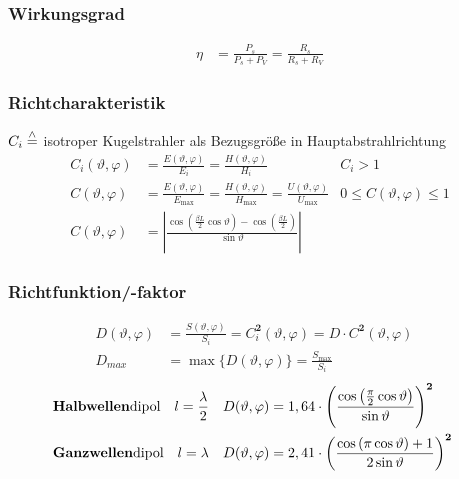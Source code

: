 \subsubsection{Wirkungsgrad}
\begin{align*}
    \eta & = \frac{P_s}{P_s + P_V} = \frac{R_s}{R_s + R_V}
\end{align*}

\subsubsection{Richtcharakteristik}
$C_{i} \stackrel{\wedge}{=}$ isotroper Kugelstrahler als Bezugsgröße in Hauptabstrahlrichtung
\begin{align*}
 	C_{i}(\vartheta, \varphi) & = \frac{E(\vartheta, \varphi)}{E_{i}}=\frac{H(\vartheta, \varphi)}{H_{i}}                                               & C_{i}>1\\
    C(\vartheta, \varphi)     & = \frac{E(\vartheta, \varphi)}{E_{\max}}=\frac{H(\vartheta, \varphi)}{H_{\max}} = \frac{U(\vartheta,\varphi)}{U_{\max}} & 0 \leq C(\vartheta, \varphi) \leq 1 \\
    C(\vartheta, \varphi) &= 
    \left|\frac{\cos\left(\frac{\beta L}{2}\cos\vartheta\right)-\cos\left(\frac{\beta L}{2}\right)}{\sin\vartheta}\right|
\end{align*}

\subsubsection{Richtfunktion/-faktor}
\begin{align*}
    D(\vartheta, \varphi) & = \frac{S(\vartheta, \varphi)}{S_{i}} = C^\mathbf{2}_i(\vartheta, \varphi) = D \cdot C^\mathbf{2}(\vartheta, \varphi) &\\
    D_{max} & = \max \{D(\vartheta, \varphi)\} = \frac{S_{\max}}{S_{i}}&
\end{align*}
\vspace{-0.5cm}
\begin{align*}
	&\text{\textbf{Halbwellen}dipol}\quad l=\frac{\lambda}{2} &D(\vartheta, \varphi) &= 1,64 \cdot  
	\left(\frac{\cos\left(\frac{\pi}{2}\cos\vartheta\right)}{\sin\vartheta}\right)^\mathbf{2}&\\
	&\text{\textbf{Ganzwellen}dipol}\quad l=\lambda &D(\vartheta, \varphi) &= 2,41 \cdot
	\left(\frac{\cos\left(\pi\cos\vartheta\right)+1}{2\sin\vartheta}\right)^\mathbf{2}&
\end{align*}

